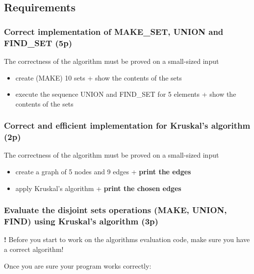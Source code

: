 \documentclass[../en-fa-lab.tex]{subfiles}
\begin{document}
\subsection{Requirements}\label{requirements}

\subsubsection{Correct implementation of MAKE\_SET, UNION and FIND\_SET
(5p)}\label{correct-implementation-of-make_set-union-and-find_set-5p}

The correctness of the algorithm must be proved on a small-sized input

\begin{itemize}
\item
  create (MAKE) 10 sets + show the contents of the sets
\item
  execute the sequence UNION and FIND\_SET for 5 elements + show the
  contents of the sets
\end{itemize}

\subsubsection{Correct and efficient implementation for Kruskal's algorithm
(2p)}\label{correct-and-efficient-implementation-for-kruskals-algorithm-2p}

The correctness of the algorithm must be proved on a small-sized input

\begin{itemize}
\item
  create a graph of 5 nodes and 9 edges + \textbf{print the edges}
\item
  apply Kruskal's algorithm + \textbf{print the chosen edges}
\end{itemize}

\subsubsection{Evaluate the disjoint sets operations (MAKE, UNION, FIND)
using Kruskal's algorithm
(3p)}\label{evaluate-the-disjoint-sets-operations-make-union-find-using-kruskals-algorithm-3p}

\textbf{!} Before you start to work on the algorithms evaluation code,
make sure you have a correct algorithm!

Once you are sure your program works correctly:
\end{document}
